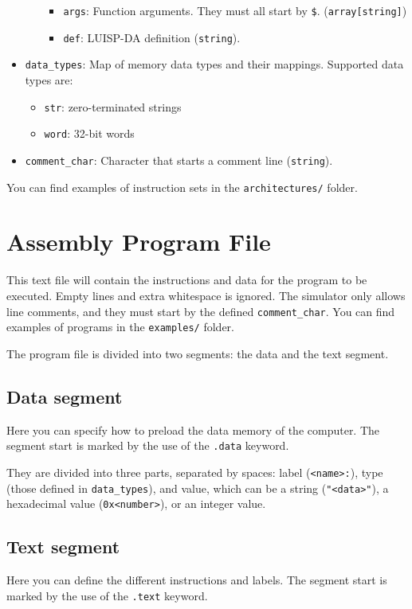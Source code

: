 \begin{itemize}[nosep,noitemsep]
\begin{itemize}
\begin{itemize}[nosep,noitemsep]
        \item \texttt{args}: Function arguments. They must all start by \texttt{\$}. (\texttt{array[string]})
        \item \texttt{def}: LUISP-DA definition (\texttt{string}).
      \end{itemize}
    \end{itemize}
  \item \texttt{data\_types}: Map of memory data types and their mappings.
  Supported data types are:
  \begin{itemize}[nosep,noitemsep]
    \item \texttt{str}: zero-terminated strings
    \item \texttt{word}: 32-bit words
  \end{itemize}
  \item \texttt{comment\_char}: Character that starts a comment line (\texttt{string}).
\end{itemize}

\noindent
You can find examples of instruction sets in the \texttt{architectures/} folder.



\section*{Assembly Program File}
This text file will contain the instructions and data for the program to be executed. Empty lines and extra whitespace is ignored. The simulator only allows line comments, and they must start by the defined \texttt{comment\_char}. You can find examples of programs in the \texttt{examples/} folder.

\noindent
The program file is divided into two segments: the data and the text segment.


\subsection*{Data segment}
Here you can specify how to preload the data memory of the computer. The segment start is marked by the use of the \texttt{.data} keyword.

They are divided into three parts, separated by spaces: label (\texttt{<name>:}), type (those defined in \texttt{data\_types}), and value, which can be a string (\texttt{"<data>"}), a hexadecimal value (\texttt{0x<number>}), or an integer value.


\subsection*{Text segment}
Here you can define the different instructions and labels. The segment start is marked by the use of the \texttt{.text} keyword.

